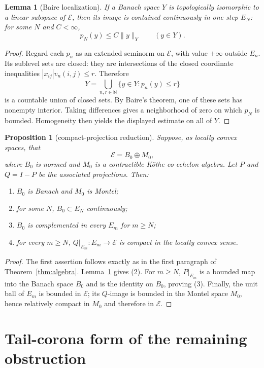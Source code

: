 \documentclass[10pt]{article}
\newtheorem{proposition}[theorem]{Proposition}
\newtheorem{lemma}[theorem]{Lemma}
\newcommand{\N}{\mathbb N}
\newcommand{\E}{\mathcal E}
\begin{document}
\begin{lemma}[Baire localization]\label{lem:baire}
If a Banach space $Y$ is topologically isomorphic to a linear subspace of
$\E$, then its image is contained continuously in one step $E_N$: for some
$N$ and $C<\infty$,
\[
                         p_N(y)\leq C\|y\|_Y\qquad(y\in Y).
\]
\end{lemma}

\begin{proof}
Regard each $p_n$ as an extended seminorm on $\E$, with value $+\infty$
outside $E_n$.  Its sublevel sets are closed: they are intersections of the
closed coordinate inequalities $|x_{ij}|v_n(i,j)\leq r$.  Therefore
\[
 Y=\bigcup_{n,r\in\N}\{y\in Y:p_n(y)\leq r\}
\]
is a countable union of closed sets.  By Baire's theorem, one of these sets
has nonempty interior.  Taking differences gives a neighborhood of zero on
which $p_N$ is bounded.  Homogeneity then yields the displayed estimate on
all of $Y$.
\end{proof}

\begin{proposition}[compact-projection reduction]\label{prop:projection}
Suppose, as locally convex spaces, that
\[
                         \E=B_0\oplus M_0,
\]
where $B_0$ is normed and $M_0$ is a contractible K\"othe co-echelon algebra.
Let $P$ and $Q=I-P$ be the associated projections.  Then:
\begin{enumerate}
\item $B_0$ is Banach and $M_0$ is Montel;
\item for some $N$, $B_0\subset E_N$ continuously;
\item $B_0$ is complemented in every $E_m$ for $m\geq N$;
\item for every $m\geq N$, $Q|_{E_m}:E_m\to\E$ is compact in the locally
convex sense.
\end{enumerate}
\end{proposition}

\begin{proof}
The first assertion follows exactly as in the first paragraph of
Theorem~\ref{thm:algebra}.  Lemma~\ref{lem:baire} gives (2).  For $m\geq N$,
$P|_{E_m}$ is a bounded map into the Banach space $B_0$ and is the identity on
$B_0$, proving (3).  Finally, the unit ball of $E_m$ is bounded in $\E$; its
$Q$-image is bounded in the Montel space $M_0$, hence relatively compact in
$M_0$ and therefore in $\E$.
\end{proof}

\section*{Tail-corona form of the remaining obstruction}
\end{document}
